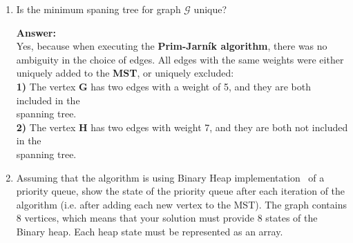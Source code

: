 \documentclass[dvipsnames]{article}
\begin{document}
\begin{enumerate}
\begin{enumerate}
\begin{center}
      \end{center}
    \color{black}

    \item Is the minimum spaning tree for graph $\mathcal{G}$ unique?

    \color{blue}
    \textbf{Answer:}\\
    Yes, because when executing the \textbf{Prim-Jarn\'ik algorithm}, there was no ambiguity in the choice of edges. All edges with the same weights were either uniquely added to the \textbf{MST}, or uniquely excluded:\\
    \hspace*{5mm} 
        \textbf{1)} The vertex \textbf{G} has two edges with a weight of 5, and they are both included in the\\\hspace*{5mm} spanning tree.\\\hspace*{5mm}
        \textbf{2)} The vertex \textbf{H} has two edges with weight 7, and they are both not included in the\\\hspace*{5mm} spanning tree.
        
    \color{black}

    \item
    Assuming that the algorithm is using Binary Heap implementation~\cite[\S 6]{Cormen2022} of a priority queue,
    show the state of the priority queue after each iteration of the algorithm (i.e. after adding each new vertex to the MST).
    The graph contains 8 vertices, which means that your solution must provide 8 states of the Binary heap.
    Each heap state must be represented as an array.


\end{enumerate}
\end{enumerate}
\end{document}
